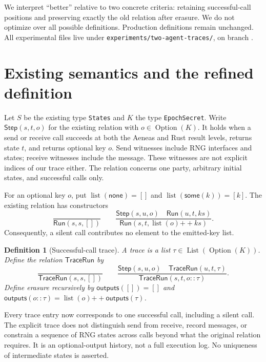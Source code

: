 \documentclass[11pt]{article}
\newtheorem{definition}{Definition}
\newcommand{\Run}{\ensuremath{\mathsf{Run}}}
\newcommand{\Trace}{\ensuremath{\mathsf{TraceRun}}}
\newcommand{\Step}{\ensuremath{\mathsf{Step}}}
\newcommand{\erase}{\ensuremath{\mathsf{outputs}}}
\newcommand{\None}{\ensuremath{\mathsf{none}}}
\newcommand{\Some}{\ensuremath{\mathsf{some}}}
\newcommand{\cat}{\mathbin{+\!+}}
\begin{document}
We interpret ``better'' relative to two concrete criteria: retaining successful-call positions
and preserving exactly the old relation after erasure. We do not optimize over all possible
definitions. Production definitions remain unchanged. All experimental files live under
\texttt{experiments/two-agent-traces/}, on branch
.

\section{Existing semantics and the refined definition}
Let $S$ be the existing type \texttt{States} and $K$ the type \texttt{EpochSecret}.
Write $\Step(s,t,o)$ for the existing relation with $o\in\operatorname{Option}(K)$.
It holds when a send or receive call succeeds at both the Aeneas and Rust result levels,
returns state $t$, and returns optional key $o$. Send witnesses include RNG interfaces and
states; receive witnesses include the message. These witnesses are not explicit indices of
our trace either. The relation concerns one party, arbitrary initial states, and successful
calls only.

For an optional key $o$, put $\operatorname{list}(\None)=[]$ and
$\operatorname{list}(\Some(k))=[k]$. The existing relation has constructors
\[
\frac{}{\Run(s,s,[])}\qquad
\frac{\Step(s,u,o)\quad\Run(u,t,ks)}
 {\Run(s,t,\operatorname{list}(o)\cat ks)}.
\]
Consequently, a silent call contributes no element to the emitted-key list.

\begin{definition}[Successful-call trace]
A trace is a list $\tau\in\operatorname{List}(\operatorname{Option}(K))$.
Define the relation $\Trace$ by
\[
\frac{}{\Trace(s,s,[])}\qquad
\frac{\Step(s,u,o)\quad\Trace(u,t,\tau)}
 {\Trace(s,t,o::\tau)}.
\]
Define erasure recursively by
$\erase([])=[]$ and
$\erase(o::\tau)=\operatorname{list}(o)\cat\erase(\tau)$.
\end{definition}

Every trace entry now corresponds to one successful call, including a silent call.
The explicit trace does not distinguish send from receive, record messages, or constrain a
sequence of RNG states across calls beyond what the original relation requires. It is an
optional-output history, not a full execution log. No uniqueness of intermediate states is asserted.
\end{document}
